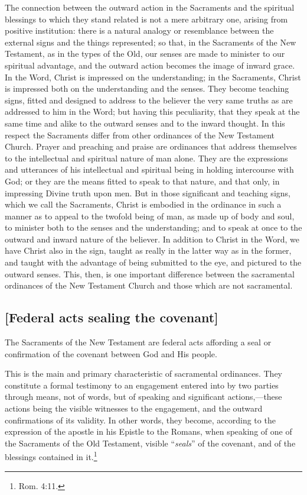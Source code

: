 \documentclass[
]{book}
\begin{document}
The connection between the outward action in the Sacraments and the spiritual blessings to which they stand related is not a mere arbitrary one, arising from positive institution: there is a natural analogy or resemblance between the external signs and the things represented; so that, in the Sacraments of the New Testament, as in the types of the Old, our senses are made to minister to our spiritual advantage, and the outward action becomes the image of inward grace. In the Word, Christ is impressed on the understanding; in the Sacraments, Christ is impressed both on the understanding and the senses. They become teaching signs, fitted and designed to address to the believer the very same truths as are addressed to him in the Word; but having this peculiarity, that they speak at the same time and alike to the outward senses and to the inward thought. In this respect the Sacraments differ from other ordinances of the New Testament Church. Prayer and preaching and praise are ordinances that address themselves to the intellectual and spiritual nature of man alone. They are the expressions and utterances of his intellectual and spiritual being in holding intercourse with God; or they are the means fitted to speak to that nature, and that only, in impressing Divine truth upon men. But in those significant and teaching signs, which we call the Sacraments, Christ is embodied in the ordinance in such a manner as to appeal to the twofold being of man, as made up of body and soul, to minister both to the senses and the understanding; and to speak at once to the outward and inward nature of the believer. In addition to Christ in the Word, we have Christ also in the sign, taught as really in the latter way as in the former, and taught with the advantage of being submitted to the eye, and pictured to the outward senses. This, then, is one important difference between the sacramental ordinances of the New Testament Church and those which are not sacramental.

\hypertarget{federal-acts-sealing-the-covenant}{%
\subsection{{[}Federal acts sealing the covenant{]}}\label{federal-acts-sealing-the-covenant}}

The Sacraments of the New Testament are federal acts affording a seal or confirmation of the covenant between God and His people.

This is the main and primary characteristic of sacramental ordinances. They constitute a formal testimony to an engagement entered into by two parties through means, not of words, but of speaking and significant actions,---these actions being the visible witnesses to the engagement, and the outward confirmations of its validity. In other words, they become, according to the expression of the apostle in his Epistle to the Romans, when speaking of one of the Sacraments of the Old Testament, visible ``\emph{seals}'' of the covenant, and of the blessings contained in it.\footnote{Rom. 4:11.}
\end{document}
